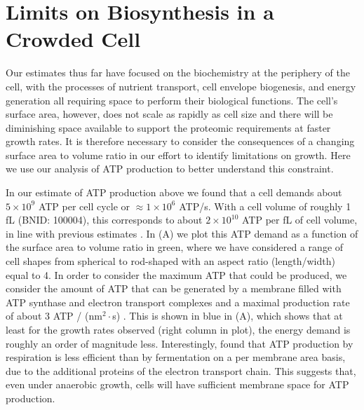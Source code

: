 \section{Limits on Biosynthesis in a Crowded Cell}
Our estimates thus far have focused on the biochemistry at the periphery of the
cell, with the processes of nutrient transport, cell envelope biogenesis, and
energy generation all requiring space to perform their biological functions. The
cell's surface area, however, does not scale as rapidly as cell size
\citep{harris2018} and there will be diminishing space available to support the
proteomic requirements at faster growth rates. It is therefore  necessary to
consider the consequences of a changing surface area to volume ratio in our effort to identify
limitations on growth. Here we use our analysis of ATP production to
better understand this constraint.

In our estimate of ATP production above we found that a cell demands about $5
\times 10^9$ ATP per cell cycle or $\approx 1 \times 10^6$ ATP/s. With a cell volume of roughly 1
fL (BNID: 100004), this corresponds to about $2 \times 10^{10}$ ATP per fL of
cell volume, in line with previous estimates \citep{stouthamer1977, szenk2017}.
In (A) we plot this ATP demand as a function of the surface area to volume
ratio in green, where we have considered a range of cell shapes from spherical
to rod-shaped with an aspect ratio (length/width) equal to 4. In order to
consider the maximum ATP that could be produced, we consider the amount of ATP
that can be generated by a membrane filled with ATP synthase and electron
transport complexes and a maximal production rate of about 3 ATP / (nm$^2
\cdot$s) \citep{szenk2017}. This is shown in blue in (A),
which shows that at least for the growth rates observed (right column in plot),
the energy demand is roughly an order of magnitude less. Interestingly,
\cite{szenk2017} found that ATP production by respiration is less efficient than
by fermentation on a per membrane area basis, due to the additional proteins of
the electron transport chain. This suggests that, even under anaerobic growth,
cells will have sufficient membrane space for ATP production.

